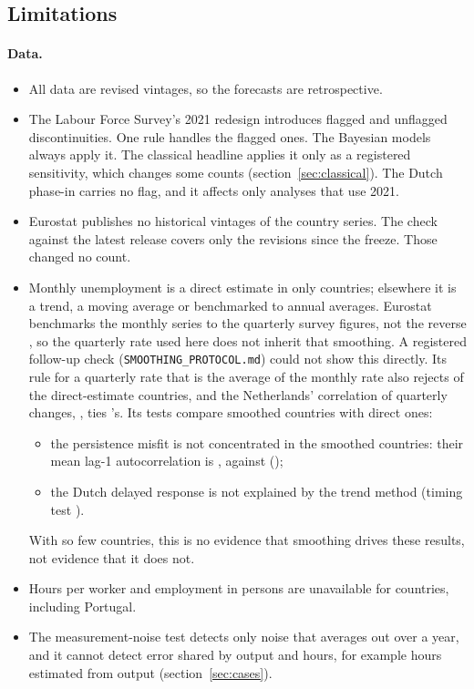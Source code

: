 \subsection{Limitations}

\paragraph{Data.}
\begin{itemize}
  \item All data are revised vintages, so the forecasts are retrospective.
  \item The Labour Force Survey's 2021 redesign introduces flagged and unflagged
    discontinuities. One rule handles the flagged ones. The Bayesian models always apply
    it. The classical headline applies it only as a registered sensitivity, which changes
    some counts (section~\ref{sec:classical}). The Dutch phase-in carries no flag, and it
    affects only analyses that use 2021.
  \item Eurostat publishes no historical vintages of the country series. The check
    against the latest release covers only the revisions since the freeze. Those changed
    no count.
  \item Monthly unemployment is a direct estimate in only  countries;
    elsewhere it is a trend, a moving average or benchmarked to annual averages. Eurostat
    benchmarks the monthly series to the quarterly survey figures, not the reverse
    \citep{eurostat_une_rt_m_esms}, so the quarterly rate used here does not inherit that
    smoothing. A registered follow-up check (\texttt{SMOOTHING\_PROTOCOL.md}) could not show this
    directly. Its rule for a quarterly rate that is the average of the monthly rate also
    rejects  of the  direct-estimate
    countries, and the Netherlands' correlation of quarterly changes, ,
    ties 's. Its tests compare  smoothed countries
    with  direct ones:
    \begin{itemize}
      \item the persistence misfit is not concentrated in the smoothed countries: their
        mean lag-1 autocorrelation is , against 
        ();
      \item the Dutch delayed response is not explained by the trend method (timing test
        ).
    \end{itemize}
    With so few countries, this is no evidence that smoothing drives these results, not
    evidence that it does not.
  \item Hours per worker and employment in persons are unavailable for
     countries, including Portugal.
  \item The measurement-noise test detects only noise that averages out over a year, and
    it cannot detect error shared by output and hours, for example hours estimated from
    output (section~\ref{sec:cases}).
\end{itemize}

